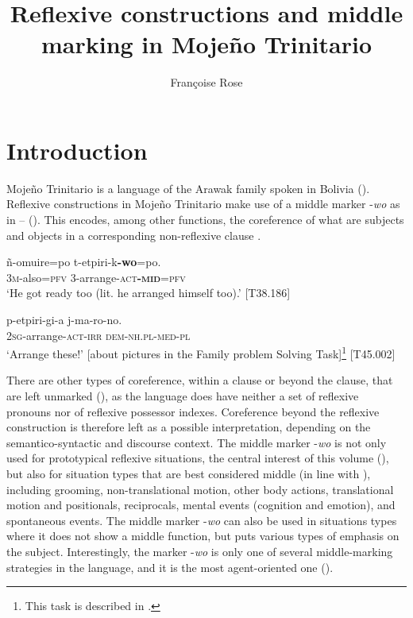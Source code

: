 \documentclass[output=paper]{langscibook}
\author{Françoise Rose\affiliation{Dynamique Du Langage, CNRS/Université Lyon2}}
\title{{Reflexive} {constructions} {and} {middle} {marking} {in} {Mojeño} {Trinitario}}
\begin{document}
\maketitle 




\section{Introduction}
\label{sec:Rose:1}

Mojeño Trinitario is a language of the Arawak family spoken in Bolivia (). Reflexive constructions in Mojeño Trinitario make use of a middle marker -\textit{wo} as in -- (). This encodes, among other functions, the coreference of what are subjects and objects in a corresponding non-reflexive clause .


\ea
\label{ex:Rose:1}
\gll ñ-omuire=po t-etpiri-k\textbf{-wo}=po. \\
3\textsc{m}-also=\textsc{pfv} 3-arrange-\textsc{act\textbf{-mid}=pfv}\\
\glt ‘He got ready too (lit. he arranged himself too).’ [T38.186]
\z

\ea
\label{ex:Rose:2}
\gll p-etpiri-gi-a j-ma-ro-no. \\
2\textsc{sg}-arrange-\textsc{act-irr} \textsc{dem-nh.pl-med-pl}\\
\glt ‘Arrange these!’ [about pictures in the Family problem Solving Task]\footnote{This task is described in \citet{SanRoque2012}.} [T45.002]
\z


There are other types of coreference, within a clause or beyond the clause, that are left unmarked (), as the language does have neither a set of reflexive pronouns nor of reflexive possessor indexes. Coreference beyond the reflexive construction is therefore left as a possible interpretation, depending on the semantico-syntactic and discourse context. The middle marker -\textit{wo} is not only used for prototypical reflexive situations, the central interest of this volume (), but also for situation types that are best considered middle (in line with \citealt{Kemmer1993}), including grooming, non-translational motion, other body actions, translational motion and positionals, reciprocals, mental events (cognition and emotion), and spontaneous events. The middle marker -\textit{wo} can also be used in situations types where it does not show a middle function, but puts various types of emphasis on the subject. Interestingly, the marker -\textit{wo} is only one of several middle-marking strategies in the language, and it is the most agent-oriented one ().
\end{document}
